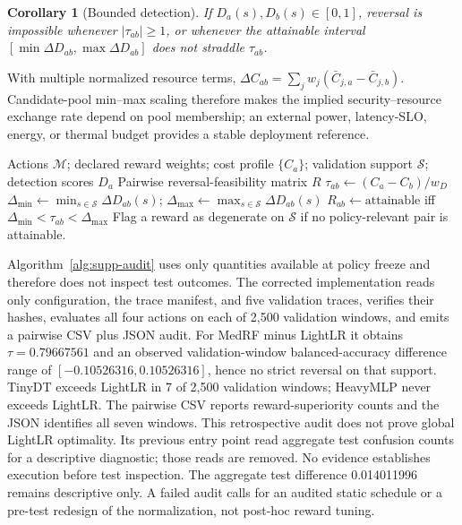 \documentclass[10pt,a4paper]{article}
\newtheorem{corollary}[theorem]{Corollary}
\begin{document}
\begin{corollary}[Bounded detection]
If $D_a(s),D_b(s)\in[0,1]$, reversal is impossible whenever $|\tau_{ab}|\ge 1$, or whenever the attainable interval $[\min\Delta D_{ab},\max\Delta D_{ab}]$ does not straddle $\tau_{ab}$.
\end{corollary}

With multiple normalized resource terms, $\Delta C_{ab}=\sum_j w_j(\bar C_{j,a}-\bar C_{j,b})$. Candidate-pool min--max scaling therefore makes the implied security--resource exchange rate depend on pool membership; an external power, latency-SLO, energy, or thermal budget provides a stable deployment reference.

\begin{algorithm}[h!]
\caption{Validation-only reward audit}\label{alg:supp-audit}
\footnotesize
\begin{algorithmic}[1]
\REQUIRE Actions $\mathcal M$; declared reward weights; cost profile $\{C_a\}$; validation support $\mathcal S$; detection scores $D_a$
\ENSURE Pairwise reversal-feasibility matrix $R$
  \STATE $\tau_{ab}\leftarrow(C_a-C_b)/w_D$
  \STATE $\Delta_{\min}\leftarrow\min_{s\in\mathcal S}\Delta D_{ab}(s)$; $\Delta_{\max}\leftarrow\max_{s\in\mathcal S}\Delta D_{ab}(s)$
  \STATE $R_{ab}\leftarrow\text{attainable}$ iff $\Delta_{\min}<\tau_{ab}<\Delta_{\max}$
\ENDFOR
\STATE Flag a reward as degenerate on $\mathcal S$ if no policy-relevant pair is attainable.
\end{algorithmic}
\end{algorithm}

Algorithm~\ref{alg:supp-audit} uses only quantities available at policy freeze and therefore does not inspect test outcomes. The corrected implementation reads only configuration, the trace manifest, and five validation traces, verifies their hashes, evaluates all four actions on each of 2{,}500 validation windows, and emits a pairwise CSV plus JSON audit. For MedRF minus LightLR it obtains $\tau=0.79667561$ and an observed validation-window balanced-accuracy difference range of $[-0.10526316,0.10526316]$, hence no strict reversal on that support. TinyDT exceeds LightLR in 7 of 2{,}500 validation windows; HeavyMLP never exceeds LightLR. The pairwise CSV reports reward-superiority counts and the JSON identifies all seven windows. This retrospective audit does not prove global LightLR optimality. Its previous entry point read aggregate test confusion counts for a descriptive diagnostic; those reads are removed. No evidence establishes execution before test inspection. The aggregate test difference 0.014011996 remains descriptive only. A failed audit calls for an audited static schedule or a pre-test redesign of the normalization, not post-hoc reward tuning.
\end{document}
